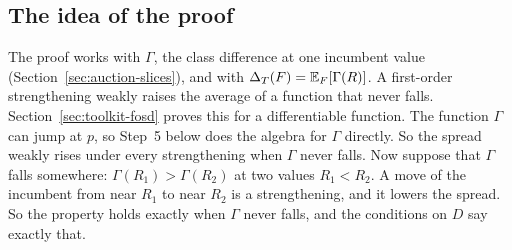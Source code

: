 \subsection*{The idea of the proof}

The proof works with \(\Gamma\), the class difference at one incumbent value (Section~\ref{sec:auction-slices}),
and with \(\Delta_T(F)=\mathbb{E}_F[\Gamma(R)]\). A first-order strengthening weakly raises the average of a function that
never falls. Section~\ref{sec:toolkit-fosd} proves this for a differentiable function. The function \(\Gamma\) can jump at
\(p\), so Step~5 below does the algebra for \(\Gamma\) directly. So the spread weakly rises under every
strengthening when \(\Gamma\) never falls. Now suppose that \(\Gamma\) falls somewhere: \(\Gamma(R_1)>\Gamma(R_2)\)
at two values \(R_1<R_2\). A move of the incumbent from near \(R_1\) to near \(R_2\) is a strengthening, and it
lowers the spread. So the property holds exactly when \(\Gamma\) never falls, and the conditions on \(D\) say
exactly that.

